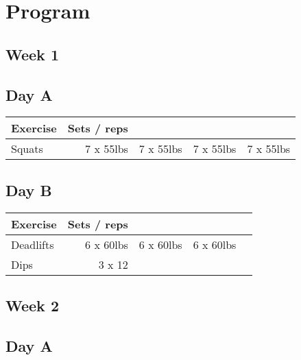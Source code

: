 \documentclass[12pt, a4paper]{article}%
\begin{document}
\clearpage
\section*{Program}
 \subsection*{\hspace{0.25em} Week 1 }
  \subsection*{\hspace{0.5em} Day A }


  \begin{tabular}{l|rrrr}
  \hspace{0.75em} \textbf{Exercise} & \textbf{Sets / reps} \\ \hline

            \hspace{0.75em} Squats
            & 7 x 55lbs
            & 7 x 55lbs
            & 7 x 55lbs
            & 7 x 55lbs
            \\


  \end{tabular}

  \subsection*{\hspace{0.5em} Day B }


  \begin{tabular}{l|rrrr}
  \hspace{0.75em} \textbf{Exercise} & \textbf{Sets / reps} \\ \hline

            \hspace{0.75em} Deadlifts
            & 6 x 60lbs
            & 6 x 60lbs
            & 6 x 60lbs
            & 
            \\


   \hspace{0.75em} Dips & 3 x 12 \\
  \end{tabular}

 \subsection*{\hspace{0.25em} Week 2 }
  \subsection*{\hspace{0.5em} Day A }
\end{document}
